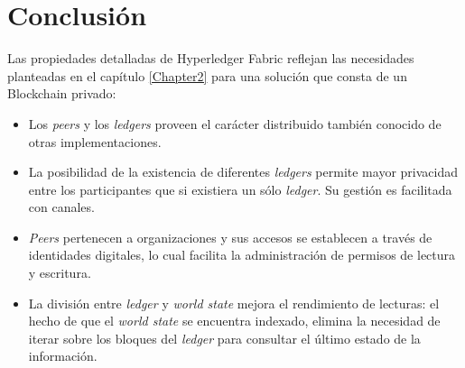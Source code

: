 \section{Conclusión}
Las propiedades detalladas de Hyperledger Fabric reflejan las necesidades planteadas en el capítulo \ref{Chapter2} para una solución que consta de un Blockchain privado:

\begin{itemize}
    \item Los \textit{peers} y los \textit{ledgers} proveen el carácter distribuido también conocido de otras implementaciones.
    \item La posibilidad de la existencia de diferentes \textit{ledgers} permite mayor privacidad entre los participantes que si existiera un sólo \textit{ledger}. Su gestión es facilitada con canales.
    \item \textit{Peers} pertenecen a organizaciones y sus accesos se establecen a través de identidades digitales, lo cual facilita la administración de permisos de lectura y escritura.
    \item La división entre \textit{ledger} y \textit{world state} mejora el rendimiento de lecturas: el hecho de que el \textit{world state} se encuentra indexado, elimina la necesidad de iterar sobre los bloques del \textit{ledger} para consultar el último estado de la información.
\end{itemize}


